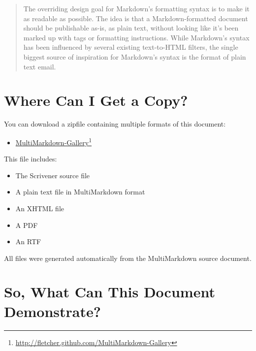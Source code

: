 \documentclass[oneside,article]{memoir}
\begin{document}
\begin{quotation}
The overriding design goal for Markdown's formatting syntax is to make it as
  readable as possible. The idea is that a Markdown-formatted document should be
  publishable as-is, as plain text, without looking like it's been marked up
  with tags or formatting instructions. While Markdown's syntax has been
  influenced by several existing text-to-HTML filters, the single biggest source
  of inspiration for Markdown's syntax is the format of plain text
  email.~\cite{Gruber}
\end{quotation}

\chapter{Where Can I Get a Copy?}
\label{wherecanigetacopy}

You can download a zipfile containing multiple formats of this document:


\begin{itemize}


\item \href{http://fletcher.github.com/MultiMarkdown-Gallery}{MultiMarkdown-Gallery}\footnote{\href{http://fletcher.github.com/MultiMarkdown-Gallery}{http://fletcher.github.com/MultiMarkdown-Gallery}}
\end{itemize}

This file includes:


\begin{itemize}


\item The Scrivener source file

\item A plain text file in MultiMarkdown format

\item An XHTML file

\item A PDF

\item An RTF
\end{itemize}

All files were generated automatically from the MultiMarkdown source document.


\chapter{So, What Can This Document Demonstrate?}
\label{sowhatcanthisdocumentdemonstrate}
\end{document}
